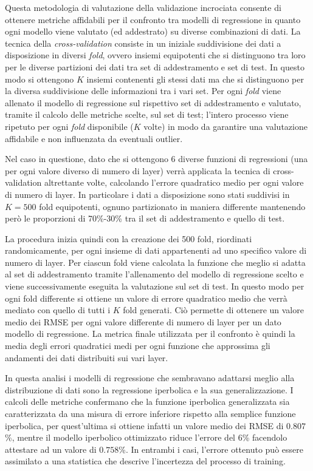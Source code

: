 Questa metodologia di valutazione della validazione incrociata consente di ottenere metriche affidabili per il confronto tra modelli di regressione in quanto ogni modello viene valutato (ed addestrato) su diverse combinazioni di dati. La tecnica della \textit{cross-validation} consiste in un iniziale suddivisione dei dati a disposizione in diversi \textit{fold}, ovvero insiemi equipotenti che si distinguono tra loro per le diverse partizioni dei dati tra set di addestramento e set di test. In questo modo si ottengono $K$ insiemi contenenti gli stessi dati ma che si distinguono per la diversa suddivisione delle informazioni tra i vari set. Per ogni \textit{fold} viene allenato il modello di regressione sul rispettivo set di addestramento e valutato, tramite il calcolo delle metriche scelte, sul set di test; l'intero processo viene ripetuto per ogni \textit{fold} disponibile ($K$ volte) in modo da garantire una valutazione affidabile e non influenzata da eventuali outlier.

Nel caso in questione, dato che si ottengono 6 diverse funzioni di regressioni (una per ogni valore diverso di numero di layer) verrà applicata la tecnica di cross-validation altrettante volte, calcolando l'errore quadratico medio per ogni valore di numero di layer. In particolare i dati a disposizione sono stati suddivisi in $K=500$ fold equipotenti, ognuno partizionato in maniera differente mantenendo però le proporzioni di 70\%-30\% tra il set di addestramento e quello di test.

La procedura inizia quindi con la creazione dei 500 fold, riordinati randomicamente, per ogni insieme di dati appartenenti ad uno specifico valore di numero di layer. Per ciascun fold viene calcolata la funzione che meglio si adatta al set di addestramento tramite l'allenamento del modello di regressione scelto e viene successivamente eseguita la valutazione sul set di test. In questo modo per ogni fold differente si ottiene un valore di errore quadratico medio che verrà mediato con quello di tutti i $K$ fold generati. Ciò permette di ottenere un valore medio dei RMSE per ogni valore differente di numero di layer per un dato modello di regressione. La metrica finale utilizzata per il confronto è quindi la media degli errori quadratici medi per ogni funzione che approssima gli andamenti dei dati distribuiti sui vari layer.

In questa analisi i modelli di regressione che sembravano adattarsi meglio alla distribuzione di dati sono la regressione iperbolica e la sua generalizzazione. I calcoli delle metriche confermano che la funzione iperbolica generalizzata sia caratterizzata da una misura di errore inferiore rispetto alla semplice funzione iperbolica, per quest'ultima si ottiene infatti un valore medio dei RMSE di $0.807$\%, mentre il modello iperbolico ottimizzato riduce l'errore del 6\% facendolo attestare ad un valore di $0.758$\%. In entrambi i casi, l'errore ottenuto può essere assimilato a una statistica che descrive l'incertezza del processo di training.


